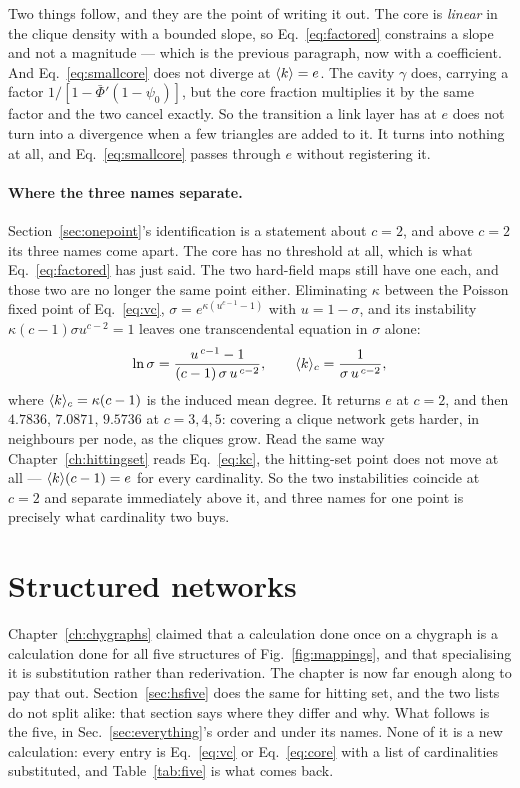 Two things follow, and they are the point of writing it out. The core is
\emph{linear} in the clique density with a bounded slope, so
Eq.~\eqref{eq:factored} constrains a slope and not a magnitude --- which is the
previous paragraph, now with a coefficient. And Eq.~\eqref{eq:smallcore} does
not diverge at $\langle k \rangle=e$. The cavity $\gamma$ does, carrying a factor
$1/[1-\bar\Phi'(1-\psi_{0})]$, but the core fraction multiplies it by the same
factor and the two cancel exactly. So the transition a link layer has at $e$
does not turn into a divergence when a few triangles are added to it. It turns
into nothing at all, and Eq.~\eqref{eq:smallcore} passes through $e$ without
registering it.

\paragraph{Where the three names separate.} Section~\ref{sec:onepoint}'s
identification is a statement about $c=2$, and above $c=2$ its three names come
apart. The core has no threshold at all, which is what
Eq.~\eqref{eq:factored} has just said. The two hard-field maps still have one
each, and those two are no longer the same point either. Eliminating
$\kappa$ between the Poisson fixed point of Eq.~\eqref{eq:vc},
$\sigma=e^{\kappa(u^{c-1}-1)}$ with $u=1-\sigma$, and its instability
$\kappa(c-1)\sigma u^{c-2}=1$ leaves one transcendental equation in $\sigma$
alone:
\begin{equation}
  \ln\sigma=\frac{u^{\,c-1}-1}{(c-1)\,\sigma\,u^{\,c-2}},
  \qquad
  \langle k \rangle_{c}=\frac{1}{\sigma\,u^{\,c-2}},
  \label{eq:vcinstab}
\end{equation}
where $\langle k \rangle_{c}=\kappa(c-1)$ is the induced mean degree. It returns $e$ at
$c=2$, and then $4.7836$, $7.0871$, $9.5736$ at $c=3,4,5$: covering a clique
network gets harder, in neighbours per node, as the cliques grow. Read the same
way Chapter~\ref{ch:hittingset} reads Eq.~\eqref{eq:kc}, the hitting-set point
does not move at all --- $\langle k \rangle(c-1)=e$ for every cardinality. So the two
instabilities coincide at $c=2$ and separate immediately above it, and three
names for one point is precisely what cardinality two buys.

\section{Structured networks}
\label{sec:fivecover}

Chapter~\ref{ch:chygraphs} claimed that a calculation done once on a chygraph
is a calculation done for all five structures of Fig.~\ref{fig:mappings}, and
that specialising it is substitution rather than rederivation. The chapter is
now far enough along to pay that out. Section~\ref{sec:hsfive} does the same
for hitting set, and the two lists do not split alike: that section says where
they differ and why. What follows is the five, in
Sec.~\ref{sec:everything}'s order and under its names. None of it is a new
calculation: every entry is Eq.~\eqref{eq:vc} or Eq.~\eqref{eq:core} with a
list of cardinalities substituted, and Table~\ref{tab:five} is what comes back.

